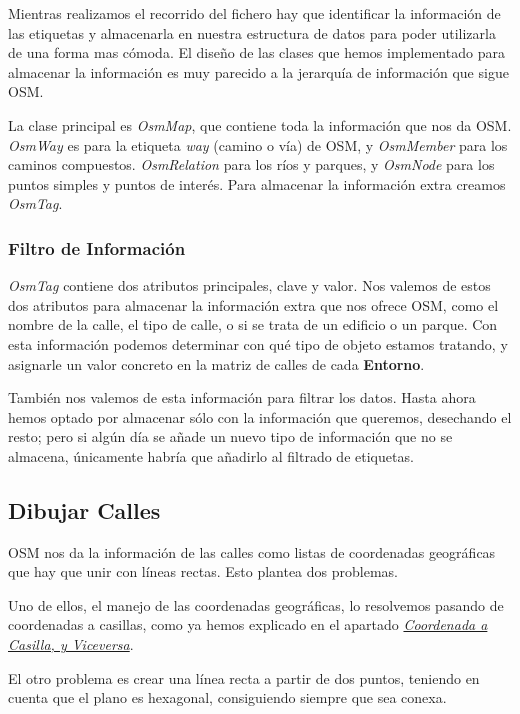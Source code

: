 Mientras realizamos el recorrido del fichero hay que identificar la información
de las etiquetas y almacenarla en nuestra estructura de datos para poder
utilizarla de una forma mas cómoda. El diseño de las clases que hemos
implementado para almacenar la información es muy parecido a la jerarquía de
información que sigue OSM.

La clase principal es {\em OsmMap}, que contiene toda la información que nos da
OSM. {\em OsmWay} es para la etiqueta {\em way} (camino o vía) de OSM, y {\em
OsmMember} para los caminos compuestos. {\em OsmRelation} para los ríos y
parques, y {\em OsmNode} para los puntos simples y puntos de interés. Para
almacenar la información extra creamos {\em OsmTag}.

\subsubsection{Filtro de Información}

{\em OsmTag} contiene dos atributos principales, clave y valor. Nos valemos de
estos dos atributos para almacenar la información extra que nos ofrece OSM, como
el nombre de la calle, el tipo de calle, o si se trata de un edificio o un
parque. Con esta información podemos determinar con qué tipo de objeto estamos
tratando, y asignarle un valor concreto en la matriz de calles de cada {\bf
Entorno}.

También nos valemos de esta información para filtrar los datos. Hasta ahora
hemos optado por almacenar sólo con la información que queremos, desechando el
resto; pero si algún día se añade un nuevo tipo de información que no se
almacena, únicamente habría que añadirlo al filtrado de etiquetas.

\subsection{Dibujar Calles}

OSM nos da la información de las calles como listas de coordenadas geográficas
que hay que unir con líneas rectas. Esto plantea dos problemas.

Uno de ellos, el manejo de las coordenadas geográficas, lo resolvemos pasando de
coordenadas a casillas, como ya hemos explicado en el apartado
\hyperref[coordToCasilla]{{\em Coordenada a Casilla, y Viceversa}}.

El otro problema es crear una línea recta a partir de dos puntos, teniendo en
cuenta que el plano es hexagonal, consiguiendo siempre que sea conexa.

